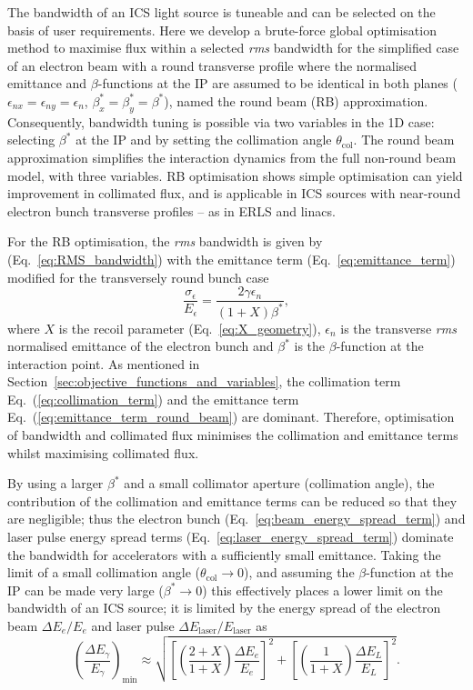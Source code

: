 \documentclass[../main.tex]{subfiles}
\begin{document}
The bandwidth of an ICS light source is tuneable and can be selected on the basis of user requirements. Here we develop a brute-force global optimisation method to maximise flux within a selected \textit{rms} bandwidth for the simplified case of an electron beam with a round transverse profile where the normalised emittance and $\beta$-functions at the IP are assumed to be identical in both planes ($\epsilon_{nx} = \epsilon_{ny} = \epsilon_{n}$, $\beta_{x}^{*} = \beta_{y}^{*} = \beta^{*}$), named the round beam (RB) approximation. Consequently, bandwidth tuning is possible via two variables in the 1D case: selecting $\beta^{*}$ at the IP and by setting the collimation angle $\theta_{\mathrm{col}}$. The round beam approximation simplifies the interaction dynamics from the full non-round beam model, with three variables. RB optimisation shows simple optimisation can yield improvement in collimated flux, and is applicable in ICS sources with near-round electron bunch transverse profiles -- as in ERLS and linacs.

For the RB optimisation, the \textit{rms} bandwidth is given by (Eq.~\ref{eq:RMS_bandwidth}) with the emittance term (Eq.~\ref{eq:emittance_term}) modified for the transversely round bunch case
\begin{equation}
\frac{\sigma_{\epsilon}}{E_{\epsilon}} = \frac{2\gamma\epsilon_{n}}{\left(1+X\right)\beta^{*}},
\label{eq:emittance_term_round_beam}    
\end{equation}
where $X$ is the recoil parameter (Eq.~\ref{eq:X_geometry}), $\epsilon_{n}$ is the transverse \textit{rms} normalised emittance of the electron bunch and $\beta^{*}$ is the $\beta$-function at the interaction point. As mentioned in Section~\ref{sec:objective_functions_and_variables}, the collimation term Eq.~(\ref{eq:collimation_term}) and the emittance term Eq.~(\ref{eq:emittance_term_round_beam}) are dominant. Therefore, optimisation of bandwidth and collimated flux minimises the collimation and emittance terms whilst maximising collimated flux.

By using a larger $\beta^{*}$ and a small collimator aperture (collimation angle), the contribution of the collimation and emittance terms can be reduced so that they are negligible; thus the electron bunch (Eq.~\ref{eq:beam_energy_spread_term}) and laser pulse energy spread terms (Eq.~\ref{eq:laser_energy_spread_term}) dominate the bandwidth for accelerators with a sufficiently small emittance. Taking the limit of a small collimation angle ($\theta_{\mathrm{col}}\rightarrow 0$), and assuming the $\beta$-function at the IP can be made very large ($\beta^{*}\rightarrow 0$) this effectively places a lower limit on the bandwidth of an ICS source; it is limited by the energy spread of the electron beam $\Delta E_{e}/E_{e}$ and laser pulse $\Delta E_{\mathrm{laser}}/E_{\mathrm{laser}}$ as 
\begin{equation}
\left(\frac{\Delta E_{\gamma}}{E_{\gamma}}\right)_{\mathrm{min}} \approx \sqrt{\left[\left(\frac{2+X}{1+X}\right)\frac{\Delta E_{e}}{E_{e}}\right]^{2} + \left[\left(\frac{1}{1+X}\right)\frac{\Delta E_{L}}{E_{L}}\right]^{2}}.
\label{eq:bandwidth_limitation_minimum}
\end{equation}
\end{document}
